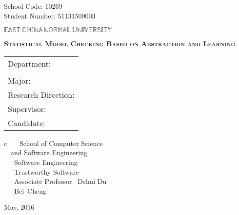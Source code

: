 \newpage

\pagestyle{empty}

\hskip 1.4cm {\large School Code: 10269}\\
\hspace*{\fill} {\large Student Number: 51131500003}

\vskip 2cm

\begin{center}
{\Huge $\mathbb{EAST}\,\mathbb{CHINA}\,\mathbb{NORMAL}\,
\mathbb{UNIVERSITY}$}
\end{center}

\vskip 3cm

\begin{center}
{\huge \bf \scshape Statistical Model Checking Based on Abstraction and Learning}
\end{center}

\vskip 2cm {\large
\begin{center}
\begin{tabular}{l}
Department:\\
			\\
Major:\\
Research Direction:\\
Supervisor:\\
Candidate:
\end{tabular}
\begin{tabular}c
~~~School of Computer Science  \\
\hline ~~and Software Engineering  \\
\hline ~~~Software Engineering  \\
\hline ~~~Trustworthy Software  \\
\hline ~~~Associate Professor ~Dehui Du~  \\
\hline ~~~Bei~Cheng  \\
\hline
\end{tabular}
\end{center}}

\vskip 30mm

\begin{center}
{\Large May, 2016}
\end{center}
